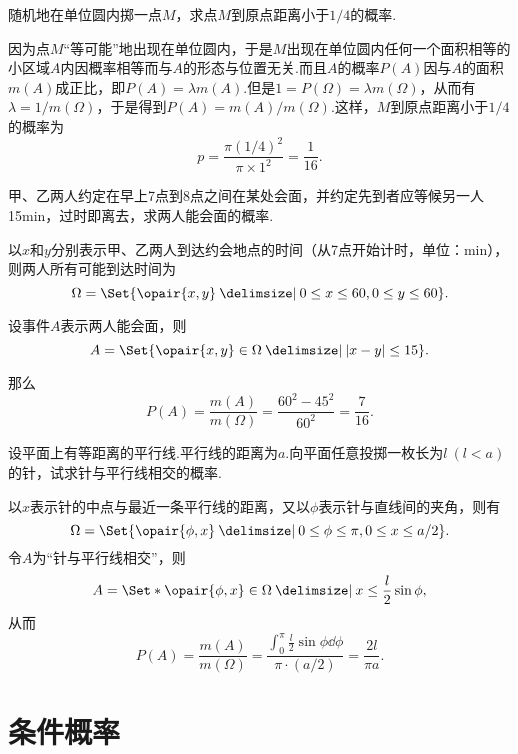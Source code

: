 \begin{example}
随机地在单位圆内掷一点\(M\)，求点\(M\)到原点距离小于\(1/4\)的概率.
\begin{solution}
因为点\(M\)“等可能”地出现在单位圆内，于是\(M\)出现在单位圆内任何一个面积相等的小区域\(A\)内因概率相等而与\(A\)的形态与位置无关.而且\(A\)的概率\(P(A)\)因与\(A\)的面积\(m(A)\)成正比，即\(P(A)=\lambda m(A)\).但是\(1 = P(\Omega) = \lambda m(\Omega)\)，从而有\(\lambda = 1/m(\Omega)\)，于是得到\(P(A) = m(A)/m(\Omega)\).这样，\(M\)到原点距离小于\(1/4\)的概率为\[
p = \frac{\pi (1/4)^2}{\pi \times 1^2} = \frac{1}{16}.
\]
\end{solution}
\end{example}

\begin{example}[会面问题]
甲、乙两人约定在早上7点到8点之间在某处会面，并约定先到者应等候另一人15min，过时即离去，求两人能会面的概率.
\begin{solution}
以\(x\)和\(y\)分别表示甲、乙两人到达约会地点的时间（从7点开始计时，单位：min），则两人所有可能到达时间为\[
\Omega = \Set{ \opair{x,y} \given 0 \leq x \leq 60, 0 \leq y \leq 60 }.
\]

设事件\(A\)表示两人能会面，则\[
A = \Set{ \opair{x,y}\in\Omega \given \abs{x-y} \leq 15 }.
\]

那么\[
P(A) = \frac{m(A)}{m(\Omega)} = \frac{60^2 - 45^2}{60^2} = \frac{7}{16}.
\]
\end{solution}
\end{example}

\begin{example}[布冯投针问题]
设平面上有等距离的平行线.平行线的距离为\(a\).向平面任意投掷一枚长为\(l\ (l<a)\)的针，试求针与平行线相交的概率.
\begin{solution}
以\(x\)表示针的中点与最近一条平行线的距离，又以\(\phi\)表示针与直线间的夹角，则有\[
\Omega = \Set{ \opair{\phi,x} \given 0 \leq \phi \leq \pi, 0 \leq x \leq a/2 }.
\]令\(A\)为“针与平行线相交”，则\[
A = \Set*{ \opair{\phi,x}\in\Omega \given x \leq \frac{l}{2} \sin\phi },
\]从而\[
P(A) = \frac{m(A)}{m(\Omega)} = \frac{\int_0^{\pi}\frac{l}{2} \sin\phi \dd{\phi}}{\pi \cdot (a/2)} = \frac{2l}{\pi a}.
\]
\end{solution}
\end{example}

\section{条件概率}

